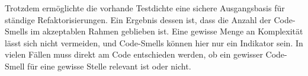 Trotzdem ermöglichte die vorhande Testdichte eine sichere Ausgangsbasis für ständige Refaktorisierungen. Ein Ergebnis dessen ist, dass die Anzahl der Code-Smells im akzeptablen Rahmen geblieben ist. Eine gewisse Menge an Komplexität lässt sich nicht vermeiden, und Code-Smells können hier nur ein Indikator sein. In vielen Fällen muss direkt am Code entschieden werden, ob ein gewisser Code-Smell für eine gewisse Stelle relevant ist oder nicht.
